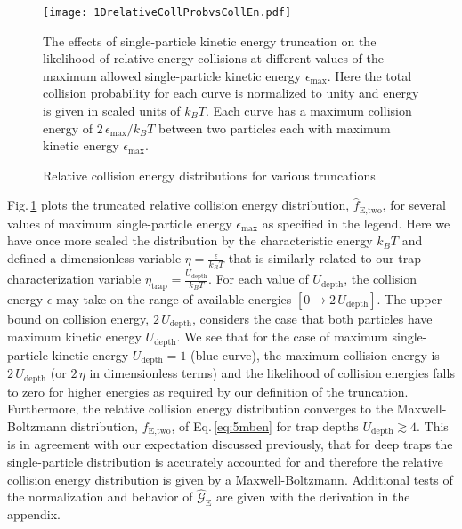 	\begin{figure} 
	\centerline{
	  \texttt{[image: 1DrelativeCollProbvsCollEn.pdf]}}
	  \caption{Relative collision energy distributions for various truncations}{The effects of single-particle kinetic energy truncation on the likelihood of relative energy collisions at different values of the maximum allowed single-particle kinetic energy $\epsilon_\text{max}$. Here the total collision probability for each curve is normalized to unity and energy is given in scaled units of $k_B T$. Each curve has a maximum collision energy of $2\,\epsilon_\text{max}/k_B T$ between two particles each with maximum kinetic energy $\epsilon_\text{max}$.}
	  \label{fig:relativeCollProb}
	\end{figure}
Fig.\,\ref{fig:relativeCollProb} plots the truncated relative collision energy distribution, $\hat{f}_\text{E,two}$, for several values of maximum single-particle energy $\epsilon_\text{max}$ as specified in the legend.
Here we have once more scaled the distribution by the characteristic energy $k_B T$ and defined a dimensionless variable $\eta = \displaystyle \frac{\epsilon}{k_B T}$ that is similarly related to our trap characterization variable $\eta_\text{trap} = \displaystyle \frac{U_\text{depth}}{k_B T}$.
For each value of $U_\text{depth}$, the collision energy $\epsilon$ may take on the range of available energies $[ 0 \rightarrow 2\,U_\text{depth} ]$.
The upper bound on collision energy, $2\,U_\text{depth}$, considers the case that both particles have maximum kinetic energy $U_\text{depth}$.
We see that for the case of maximum single-particle kinetic energy $U_\text{depth}=1$ (blue curve), the maximum collision energy is $2\,U_\text{depth}$ (or $2\,\eta$ in dimensionless terms) and the likelihood of collision energies falls to zero for higher energies as required by our definition of the truncation.
Furthermore, the relative collision energy distribution converges to the Maxwell-Boltzmann distribution, $f_\text{E,two}$, of Eq.\,\ref{eq:5mben} for trap depths $U_\text{depth} \gtrsim 4$.
This is in agreement with our expectation discussed previously, that for deep traps the single-particle distribution is accurately accounted for and therefore the relative collision energy distribution is given by a Maxwell-Boltzmann.
Additional tests of the normalization and behavior of $\hat{\mathcal{G}}_\text{E}$ are given with the derivation in the appendix.


